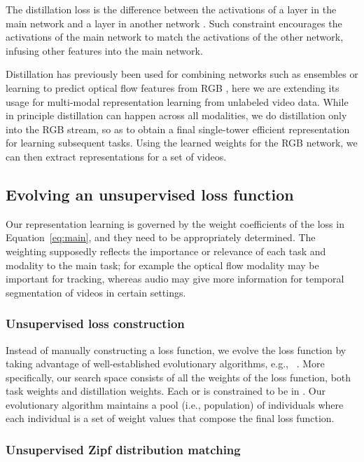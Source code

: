 \documentclass[10pt,twocolumn,letterpaper]{article}
\begin{document}
The distillation loss is the  difference between the activations of a layer in the main network  and a layer in another network . Such constraint encourages the activations of the main network to match the activations of the other network, infusing other features into the main network.


Distillation has previously been used for combining networks such as ensembles \cite{hinton2015distilling} or learning to predict optical flow features from RGB \cite{stroud2018d3d}, here we are extending its usage for multi-modal representation learning from unlabeled video data.
While in principle distillation can happen across all modalities, we do distillation only into the RGB stream, so as to obtain a final single-tower efficient representation for learning subsequent tasks.
Using the learned weights for the RGB network, we can then extract representations for a set of videos. 



\subsection{Evolving an unsupervised loss function}
\label{sec:evolution}

Our representation learning is governed by the weight coefficients of the loss in Equation~\ref{eq:main}, and they need to be appropriately determined. 
The weighting supposedly reflects the importance or relevance of each task and modality to the main task; for example the optical flow modality may be important for tracking, whereas audio may give more information for temporal segmentation of videos in certain settings. 


\subsubsection{Unsupervised loss construction}
Instead of manually constructing a loss function, we evolve the loss function by taking advantage of well-established evolutionary algorithms, e.g., ~\cite{goldberg91acomparative}. More specifically, our search space consists of all the weights of the loss function, both task weights and distillation weights. Each  or  is constrained to be in . Our evolutionary algorithm maintains a pool (i.e., population) of individuals where each individual is a set of weight values that compose the final loss function. 


\subsubsection{Unsupervised Zipf distribution matching}
\label{sec:zipf}
\end{document}
